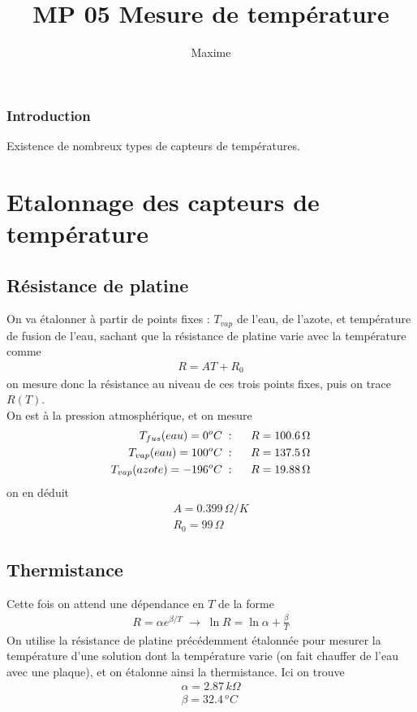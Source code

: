 \documentclass[12pt,prb,aps,epsf]{report}
\begin{document}
	
	\title{MP 05 Mesure de température}
	\author{Maxime}
	
	\maketitle
	
	\tableofcontents
	
	\pagebreak

\subsubsection{Introduction}
Existence de nombreux types de capteurs de températures.
\section{Etalonnage des capteurs de température}
\subsection{Résistance de platine}
On va étalonner à partir de points fixes : $T_{vap}$ de l'eau, de l'azote, et température de fusion de l'eau, sachant que la résistance de platine varie avec la température comme 
\begin{eqnarray}
R = AT + R_0
\end{eqnarray}
on mesure donc la résistance au niveau de ces trois points fixes, puis on trace $R(T)$.\\ On est à la pression atmosphérique, et on mesure 
\begin{eqnarray}
T_{fus}(eau) = 0^oC\; :\hspace{0.5cm} R = 100.6\, \Omega\\
T_{vap}(eau)=100^oC\; :\hspace{0.5cm} R = 137.5\, \Omega\\
T_{vap}(azote)=-196^oC\; :\hspace{0.5cm} R = 19.88\, \Omega
\end{eqnarray}
on en déduit 
\begin{eqnarray}
A = 0.399\,\Omega/K\\R_0 = 99\, \Omega
\end{eqnarray}
\subsection{Thermistance}
Cette fois on attend une dépendance en $T$ de la forme 
\begin{eqnarray}
R = \alpha e^{\beta/T}\;\rightarrow \; \ln R = \ln \alpha + \frac{\beta}{T}
\end{eqnarray}
On utilise la résistance de platine précédemment étalonnée pour mesurer la température d'une solution dont la température varie (on fait chauffer de l'eau avec une plaque), et on étalonne ainsi la thermistance. Ici on trouve 
\begin{eqnarray}
\alpha = 2.87 \,k\Omega\\
\beta = 32.4 \, ^oC
\end{eqnarray}
\end{document}
